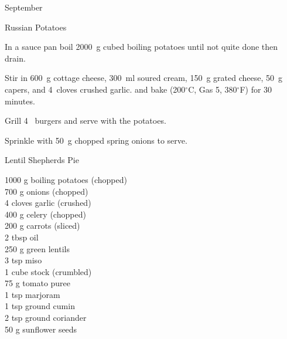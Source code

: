 \begin{menu}{September}
\begin{recipe}{2}{Russian Potatoes}
\begin{ingredients}
		\end{ingredients}
	
	
    \begin{instructions}
    \item 
        In a sauce pan boil
        2000~g cubed boiling potatoes
        until not quite done
        then drain.
      \item 
        Stir in
        600~g  cottage cheese,
        300~ml  soured cream,
        150~g grated cheese,
        50~g  capers,
        and
        4~cloves crushed garlic.
        and bake (200$^{\circ}$C, Gas 5, 380$^{\circ}$F) for 30 minutes.
      \item 
        Grill 4~  burgers and serve with the potatoes.
      \item 
        Sprinkle with
        50~g chopped spring onions
        to serve.
      
    \end{instructions}
    \end{recipe}%
  
    \begin{recipe}{2}{Lentil Shepherds Pie}%
		\begin{ingredients}
		1000 g boiling potatoes (chopped) \\
	700 g onions (chopped) \\
	4 cloves garlic (crushed) \\
	400 g celery (chopped) \\
	200 g carrots (sliced) \\
	2 tbsp oil  \\
	250 g green lentils  \\
	3 tsp miso  \\
	1 cube stock (crumbled) \\
	75 g tomato puree  \\
	1 tsp marjoram  \\
	1 tsp ground cumin  \\
	2 tsp ground coriander  \\
	50 g sunflower seeds  \\
	
		\end{ingredients}
	
	

\end{recipe}
\end{menu}

